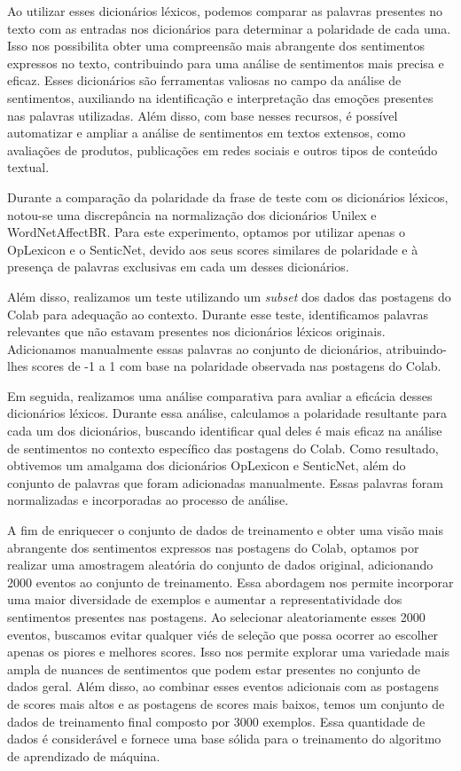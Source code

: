 Ao utilizar esses dicionários léxicos, podemos comparar as palavras presentes no texto com as entradas nos dicionários para determinar a polaridade de cada uma. Isso nos possibilita obter uma compreensão mais abrangente dos sentimentos expressos no texto, contribuindo para uma análise de sentimentos mais precisa e eficaz. Esses dicionários são ferramentas valiosas no campo da análise de sentimentos, auxiliando na identificação e interpretação das emoções presentes nas palavras utilizadas. Além disso, com base nesses recursos, é possível automatizar e ampliar a análise de sentimentos em textos extensos, como avaliações de produtos, publicações em redes sociais e outros tipos de conteúdo textual.

Durante a comparação da polaridade da frase de teste com os dicionários léxicos, notou-se uma discrepância na normalização dos dicionários Unilex e WordNetAffectBR. Para este experimento, optamos por utilizar apenas o OpLexicon e o SenticNet, devido aos seus scores similares de polaridade e à presença de palavras exclusivas em cada um desses dicionários.

Além disso, realizamos um teste utilizando um \textit{subset} dos dados das postagens do Colab para adequação ao contexto. Durante esse teste, identificamos palavras relevantes que não estavam presentes nos dicionários léxicos originais. Adicionamos manualmente essas palavras ao conjunto de dicionários, atribuindo-lhes scores de -1 a 1 com base na polaridade observada nas postagens do Colab.

Em seguida, realizamos uma análise comparativa para avaliar a eficácia desses dicionários léxicos. Durante essa análise, calculamos a polaridade resultante para cada um dos dicionários, buscando identificar qual deles é mais eficaz na análise de sentimentos no contexto específico das postagens do Colab. Como resultado, obtivemos um amalgama dos dicionários OpLexicon e SenticNet, além do conjunto de palavras que foram adicionadas manualmente. Essas palavras foram normalizadas e incorporadas ao processo de análise.

A fim de enriquecer o conjunto de dados de treinamento e obter uma visão mais abrangente dos sentimentos expressos nas postagens do Colab, optamos por realizar uma amostragem aleatória do conjunto de dados original, adicionando 2000 eventos ao conjunto de treinamento. Essa abordagem nos permite incorporar uma maior diversidade de exemplos e aumentar a representatividade dos sentimentos presentes nas postagens. Ao selecionar aleatoriamente esses 2000 eventos, buscamos evitar qualquer viés de seleção que possa ocorrer ao escolher apenas os piores e melhores scores. Isso nos permite explorar uma variedade mais ampla de nuances de sentimentos que podem estar presentes no conjunto de dados geral. Além disso, ao combinar esses eventos adicionais com as postagens de scores mais altos e as postagens de scores mais baixos, temos um conjunto de dados de treinamento final composto por 3000 exemplos. Essa quantidade de dados é considerável e fornece uma base sólida para o treinamento do algoritmo de aprendizado de máquina.

